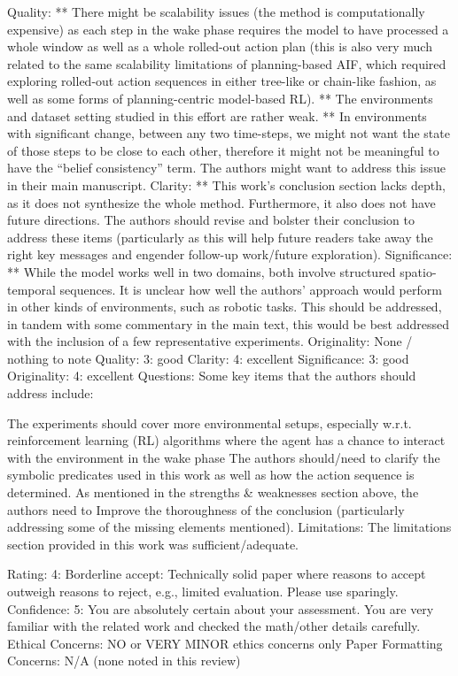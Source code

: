 Quality: ** There might be scalability issues (the method is computationally expensive) as each step in the wake phase requires the model to have processed a whole window as well as a whole rolled-out action plan (this is also very much related to the same scalability limitations of planning-based AIF, which required exploring rolled-out action sequences in either tree-like or chain-like fashion, as well as some forms of planning-centric model-based RL). ** The environments and dataset setting studied in this effort are rather weak. ** In environments with significant change, between any two time-steps, we might not want the state of those steps to be close to each other, therefore it might not be meaningful to have the “belief consistency” term. The authors might want to address this issue in their main manuscript.
Clarity: ** This work's conclusion section lacks depth, as it does not synthesize the whole method. Furthermore, it also does not have future directions. The authors should revise and bolster their conclusion to address these items (particularly as this will help future readers take away the right key messages and engender follow-up work/future exploration).
Significance: ** While the model works well in two domains, both involve structured spatio-temporal sequences. It is unclear how well the authors' approach would perform in other kinds of environments, such as robotic tasks. This should be addressed, in tandem with some commentary in the main text, this would be best addressed with the inclusion of a few representative experiments.
Originality: None / nothing to note
Quality: 3: good
Clarity: 4: excellent
Significance: 3: good
Originality: 4: excellent
Questions:
Some key items that the authors should address include:

The experiments should cover more environmental setups, especially w.r.t. reinforcement learning (RL) algorithms where the agent has a chance to interact with the environment in the wake phase
The authors should/need to clarify the symbolic predicates used in this work as well as how the action sequence is determined.
As mentioned in the strengths & weaknesses section above, the authors need to Improve the thoroughness of the conclusion (particularly addressing some of the missing elements mentioned).
Limitations:
The limitations section provided in this work was sufficient/adequate.

Rating: 4: Borderline accept: Technically solid paper where reasons to accept outweigh reasons to reject, e.g., limited evaluation. Please use sparingly.
Confidence: 5: You are absolutely certain about your assessment. You are very familiar with the related work and checked the math/other details carefully.
Ethical Concerns: NO or VERY MINOR ethics concerns only
Paper Formatting Concerns:
N/A (none noted in this review)

